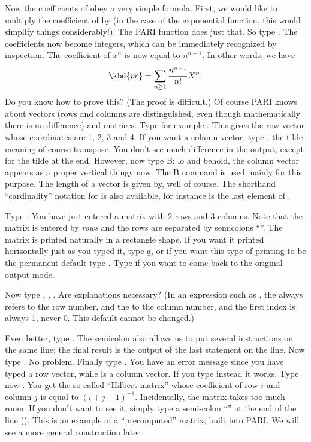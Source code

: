 Now the coefficients of  obey a very simple formula. First, we would
like to multiply the coefficient of  by  (in the case of
the exponential function, this would simplify things considerably!). The PARI
function  does just that. So type .
The coefficients now become integers, which can be immediately recognized by
inspection. The coefficient of $x^n$ is now equal to
$n^{n-1}$. In other words, we have
%
$$\kbd{pr} = \sum_{n\ge1}\dfrac{n^{n-1}}{n!} X^{n}.$$
%
Do you know how to prove this? (The proof is difficult.)
\smallskip
%
Of course PARI knows about vectors (rows and columns are distinguished, even
though mathematically there is no difference) and matrices. Type for example
\kbd{[1,2,3,4]}. This gives the row vector whose coordinates are 1, 2, 3 and
4.  If you want a column vector, type \kbd{[1,2,3,4]\til}, the tilde meaning
of course transpose. You don't see much difference in the output, except for
the tilde at the end. However, now type \b{B}: lo and behold, the column
vector appears as a proper vertical thingy now. The \b{B} command is used
mainly for this purpose. The length of a vector is given by, well
 of course. The shorthand ``cardinality'' notation  for
 is also available, for instance  is the last
element of .

Type . You have just entered a matrix with 2 rows and
3 columns. Note that the matrix is entered by \emph{rows} and the rows are
separated by semicolons ``\kbd{;}''. The matrix is printed naturally in a
rectangle shape. If you want it printed horizontally just as you typed it,
type \b{a}, or if you want this type of printing to be the permanent default
type . Type  if you want to
come back to the original output mode.

Now type , , . Are explanations necessary?
(In an expression such as , the  always refers to the
row number, and the  to the column number, and the first index is
always 1, never 0. This default cannot be changed.)

Even better, type . The semicolon also allows us to put
several instructions on the same line; the final result is the output of
the last statement on the line. Now type . No
problem. Finally type . You have an error message since you
have typed a row vector, while  is a column vector. If you type
instead  it works. \smallskip
%
\label{se:types}
Type now . You get the so-called ``Hilbert matrix''
whose coefficient of row $i$ and column $j$ is equal to $(i+j-1)^{-1}$.
Incidentally, the matrix  takes too much room. If you don't want to
see it, simply type a semi-colon ``\kbd{;}'' at the end of the line
(). This is an example of a ``precomputed'' matrix,
built into PARI. We will see a more general construction later.

